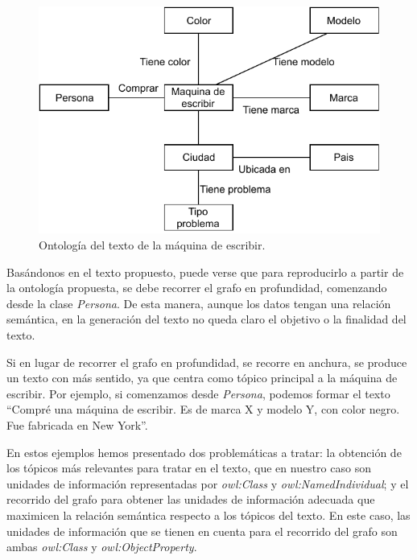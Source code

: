 \begin{figure}
    \centering
    \includegraphics[scale=0.65]{img/presentacion_problema/onto_maq_escr.pdf}
    \caption{Ontología del texto de la máquina de escribir.}
    \label{fig:maquina_escr}
\end{figure}

Basándonos en el texto propuesto, puede verse que para reproducirlo a partir de la ontología propuesta, se debe recorrer el grafo en profundidad, comenzando desde la clase \emph{Persona}. De esta manera, aunque los datos tengan una relación semántica, en la generación del texto no queda claro el objetivo o la finalidad del texto. 

Si en lugar de recorrer el grafo en profundidad, se recorre en anchura, se produce un texto con más sentido, ya que centra como tópico principal a la máquina de escribir. Por ejemplo, si comenzamos desde \emph{Persona}, podemos formar el texto ``Compré una máquina de escribir. Es de marca X y modelo Y, con color negro. Fue fabricada en New York''.


En estos ejemplos hemos presentado dos problemáticas a tratar: la obtención de los tópicos más relevantes para tratar en el texto, que en nuestro caso son unidades de información representadas por \emph{owl:Class} y \emph{owl:NamedIndividual}; y el recorrido del grafo para obtener las unidades de información adecuada que maximicen la relación semántica respecto a los tópicos del texto. En este caso, las unidades de información que se tienen en cuenta para el recorrido del grafo son ambas \emph{owl:Class} y \emph{owl:ObjectProperty}.
 
